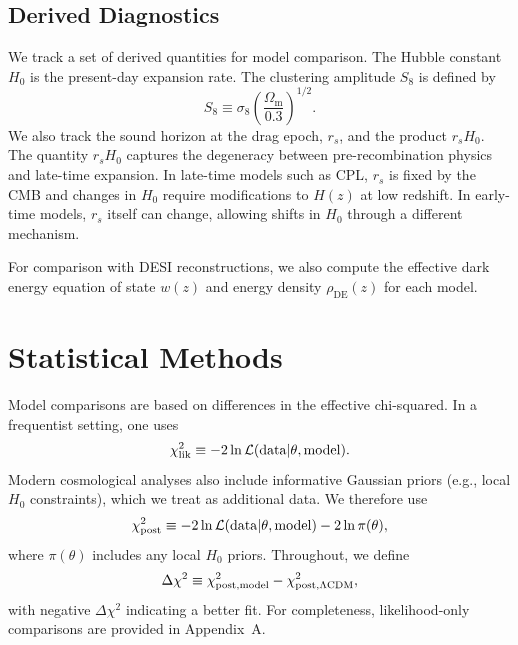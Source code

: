 \documentclass[a4paper,11pt]{article}
\begin{document}

\subsection{Derived Diagnostics}
\label{sec:diagnostics}

We track a set of derived quantities for model comparison. The Hubble constant $H_0$ is the present-day expansion rate. The clustering amplitude $S_8$ is defined by
\begin{equation}
S_8 \equiv \sigma_8 \left(\frac{\Omega_{\mathrm{m}}}{0.3}\right)^{1/2}.
\end{equation}
We also track the sound horizon at the drag epoch, $r_s$, and the product $r_s H_0$. The quantity $r_s H_0$ captures the degeneracy between pre-recombination physics and late-time expansion. In late-time models such as CPL, $r_s$ is fixed by the CMB and changes in $H_0$ require modifications to $H(z)$ at low redshift. In early-time models, $r_s$ itself can change, allowing shifts in $H_0$ through a different mechanism.

For comparison with DESI reconstructions, we also compute the effective dark energy equation of state $w(z)$ and energy density $\rho_{\mathrm{DE}}(z)$ for each model.


\section{Statistical Methods}

Model comparisons are based on differences in the effective chi-squared. In a frequentist setting, one uses
\begin{equation}
\chi^2_{\rm lik} \equiv -2 \ln \mathcal{L}(\mathrm{data}|\theta,\mathrm{model}).
\end{equation}
Modern cosmological analyses also include informative Gaussian priors (e.g., local $H_0$ constraints), which we treat as additional data. We therefore use
\begin{equation}
\chi^2_{\rm post} \equiv -2 \ln \mathcal{L}(\mathrm{data}|\theta,\mathrm{model}) - 2 \ln \pi(\theta),
\end{equation}
where $\pi(\theta)$ includes any local $H_0$ priors. Throughout, we define
\begin{equation}
\Delta\chi^2 \equiv \chi^2_{\rm post, model} - \chi^2_{\rm post,\Lambda{\rm CDM}},
\end{equation}
with negative $\Delta\chi^2$ indicating a better fit. For completeness, likelihood-only comparisons are provided in Appendix~A.
\end{document}
